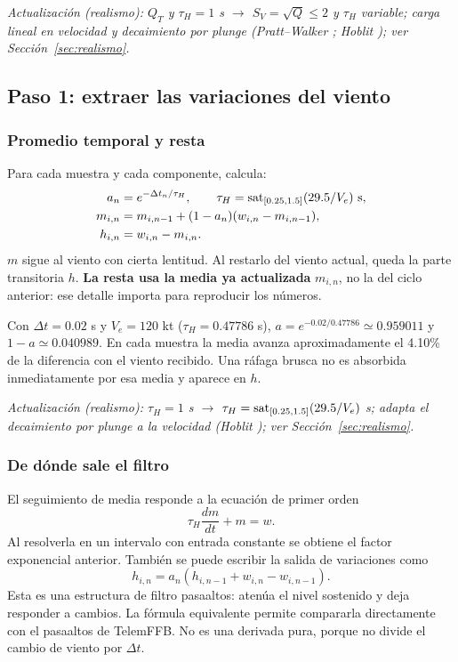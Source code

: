 \textit{Actualización (realismo): $Q_T$ y $\tau_H=1$ s $\rightarrow$ $S_V=\sqrt Q\le2$ y $\tau_H$ variable; carga lineal en velocidad y decaimiento por plunge (Pratt--Walker \cite{pratt1954}; Hoblit \cite{hoblit1988}); ver Sección~\ref{sec:realismo}.}

\subsection{Paso 1: extraer las variaciones del viento}
\subsubsection{Promedio temporal y resta}
Para cada muestra y cada componente,  calcula:
\begin{align}
a_n&=e^{-\Delta t_n/\tau_H},\qquad \tau_H=\operatorname{sat}_{[0.25,1.5]}(29.5/V_e)\ {\rm s},\\
m_{i,n}&=m_{i,n-1}+(1-a_n)(w_{i,n}-m_{i,n-1}),\\
h_{i,n}&=w_{i,n}-m_{i,n}.
\label{eq:turb-hp}
\end{align}
$m$ sigue al viento con cierta lentitud. Al restarlo del viento actual, queda la parte transitoria $h$. \textbf{La resta usa la media ya actualizada} $m_{i,n}$, no la del ciclo anterior: ese detalle importa para reproducir los números.

Con $\Delta t=0.02$ s y $V_e=120$ kt ($\tau_H=0.47786$ s), $a=e^{-0.02/0.47786}\simeq0.959011$ y $1-a\simeq0.040989$. En cada muestra la media avanza aproximadamente el 4.10\% de la diferencia con el viento recibido. Una ráfaga brusca no es absorbida inmediatamente por esa media y aparece en $h$.

\textit{Actualización (realismo): $\tau_H=1$ s $\rightarrow$ $\tau_H=\operatorname{sat}_{[0.25,1.5]}(29.5/V_e)$ s; adapta el decaimiento por plunge a la velocidad (Hoblit \cite{hoblit1988}); ver Sección~\ref{sec:realismo}.}

\subsubsection{De dónde sale el filtro}
El seguimiento de media responde a la ecuación de primer orden
\begin{equation}
\tau_H\frac{dm}{dt}+m=w.
\end{equation}
Al resolverla en un intervalo con entrada constante se obtiene el factor exponencial anterior. También se puede escribir la salida de variaciones como
\begin{equation}
h_{i,n}=a_n(h_{i,n-1}+w_{i,n}-w_{i,n-1}).
\label{eq:turb-hp-equiv}
\end{equation}
Esta es una estructura de filtro pasaaltos: atenúa el nivel sostenido y deja responder a cambios. La fórmula equivalente permite compararla directamente con el pasaaltos de TelemFFB. No es una derivada pura, porque no divide el cambio de viento por $\Delta t$.

